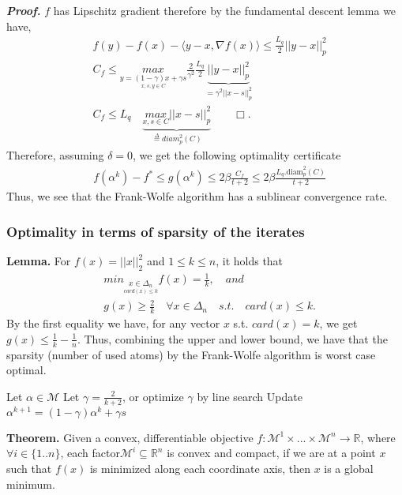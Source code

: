 \textbf{\textit{Proof.}} $f$ has Lipschitz gradient therefore by the fundamental descent lemma we have,
\begin{equation*}
\begin{aligned}
      &f(y)- f(x)- \langle y- x, \nabla f(x)\rangle \leq \frac{L_{q}}{2}||y- x||_{p}^{2}\\
      &C_{f} \leq \underset{\underset{x,s,y\in C}{y=(1-\gamma)x+\gamma s}}{max}\frac{2}{\gamma^{2}}\frac{L_{q}}{2}\underbrace{||y- x||_{p}^{2}}_{=\gamma^{2}||x- s||_{p}^{2}}\\
      &C_{f} \leq L_{q}\quad\underbrace{\underset{x,s\in C}{max}||x- s||_{p}^{2}}_{\overset{\Delta}{=}\textit{diam}_{p}^{2}(C)}\quad\quad\Box.
\end{aligned}
\end{equation*}
Therefore, assuming $\delta=0$, we get the following optimality certificate
\begin{equation*}
\begin{aligned}
      &f(\alpha^{k})- f^{*}\leq  g(\alpha^{k})\leq 2\beta\frac{C_{f}}{t+2}\leq 2\beta\frac{L_{q}.\text{diam}_{p}^{2}(C)}{t+2}
\end{aligned}
\end{equation*}
Thus, we see that the Frank-Wolfe algorithm has a sublinear convergence rate.
\subsubsection*{Optimality in terms of sparsity of the iterates}
\textbf{Lemma.} For $f(x)= ||x||_{2}^{2}$ and $1\leq k\leq n$, it holds that
\begin{equation*}
\begin{aligned}
      &\textit{min}_{\underset{card(x)\leq
      k}{x\in\Delta_{n}}}f(x)= \frac{1}{k},\quad\textit{and}\\
      &g(x)\geq \frac{2}{k}\quad\forall x\in\Delta_{n}\quad\textit{s.t.}\quad card(x)\leq k.
\end{aligned}
\end{equation*}
By the first equality we have, for any vector $x$ s.t. $card(x)= k$, we get $g(x)\leq \frac{1}{k}- \frac{1}{n}$.
Thus, combining the upper and lower bound, we have that the sparsity (number of used atoms) by the Frank-Wolfe algorithm is worst case optimal.
\begin{algorithmic}
   \STATE Let $\alpha\in\mathcal{M}$
   \STATE Let $\gamma = \frac{2}{k+2}$, or optimize $\gamma$ by line search
   \STATE Update $\alpha^{k+1}= (1-\gamma)\alpha^{k}+ \gamma s$
   \ENDFOR
\end{algorithmic}
\textbf{Theorem.} Given a convex, differentiable objective
$f:\mathcal{M}^{1}\times...\times\mathcal{M}^{n}\to\mathbb{R}$, where $\forall
i\in\{1..n\}$, each factor\quad $\mathcal{M}^{i}\subseteq\mathbb{R}^{n}$ is
convex and compact, if we are at a point $x$ such that $f(x)$ is minimized along
each coordinate axis, then $x$ is a global minimum.\\

